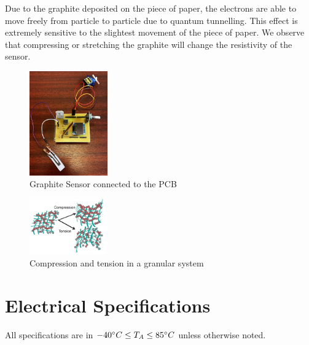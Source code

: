 \documentclass[10pt]{datasheet}
\begin{document}
Due to the graphite deposited on the piece of paper, the electrons are able to move freely from particle to particle due to quantum tunnelling. This effect is
extremely sensitive to the slightest movement of the piece of paper. We observe that compressing or stretching the graphite will change the resistivity of the 
sensor. 


\vfill\break

\hspace{1pt}

\vspace{0.65cm}

\begin{figure}[h!]
	\centering
	\includegraphics[width=0.3\textwidth]{Cover/PCB-Sensor.jpg}
	\caption{\small{Graphite Sensor connected to the PCB}}
\end{figure}

\vspace{1.5cm}

\begin{figure}[h!]
	\centering
	\includegraphics[width=0.3\textwidth]{Cover/Electron-Movement.png}
	\caption{\small{Compression and tension in a granular system}}
\end{figure}

\onecolumn

\section{Electrical Specifications}
All specifications are in $-40\degree C \leq T_A \leq 85\degree C$ unless otherwise noted.
\end{document}
